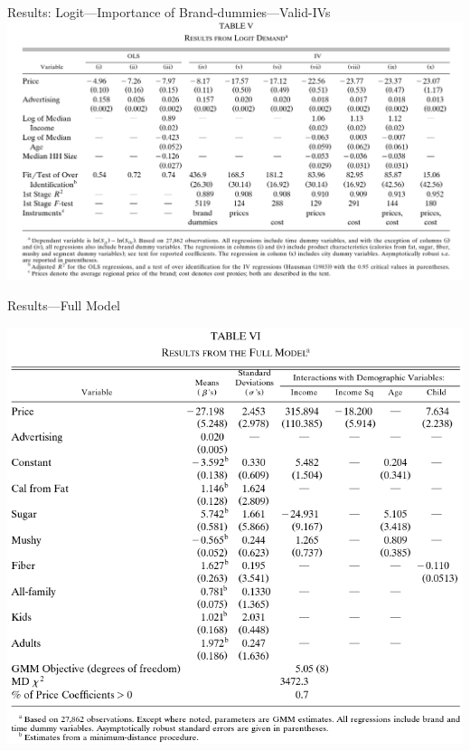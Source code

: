 \documentclass[dvipsnames]{beamer}
\begin{document}
 \begin{frame}{Results: Logit---Importance of Brand-dummies---Valid-IVs}
   \centering
   \includegraphics[width=\textwidth, keepaspectratio=true]{tab5.png}
   \end{frame}
   \begin{frame}{Results---Full Model}
     \begin{center}
       \includegraphics[height=0.9\textheight, keepaspectratio=true]{tab6.png}
     \end{center}
   \end{frame}
\end{document}
